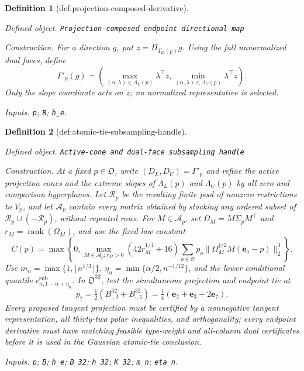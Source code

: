 \documentclass{article}
\newtheorem{definition}{Definition}
\begin{document}
\begin{definition}[def:projection-composed-derivative]\label{def:projection-composed-derivative}
\par\smallskip\noindent\emph{Defined object.} \texttt{Projection-\allowbreak{}composed endpoint directional map}
\par\smallskip\noindent\emph{Construction.} For a direction \(g\), put \(z=\Pi_{T_{\mathfrak O}(p)}g\).  Using the full unnormalized dual faces, define
\[
\Gamma'_p(g)=\left(
\max_{(\alpha,\lambda)\in\Lambda_L(p)}\lambda^{\top}z,
\min_{(\alpha,\lambda)\in\Lambda_U(p)}\lambda^{\top}z
\right).
\]
Only the slope coordinate acts on \(z\); no normalized representative is selected.
\par\smallskip\noindent\emph{Inputs.} \texttt{p}; \texttt{B}; \texttt{h\_\allowbreak{}e}.
\end{definition}

\begin{definition}[def:atomic-tie-subsampling-handle]\label{def:atomic-tie-subsampling-handle}
\par\smallskip\noindent\emph{Defined object.} \texttt{Active-\allowbreak{}cone and dual-\allowbreak{}face subsampling handle}
\par\smallskip\noindent\emph{Construction.} At a fixed \(p\in\mathfrak O\), write \((D_L,D_U)=\Gamma'_p\) and refine the active projection cones and the extreme slopes of \(\Lambda_L(p)\) and \(\Lambda_U(p)\) by all zero and comparison hyperplanes.  Let \(\mathcal R_p\) be the resulting finite pool of nonzero restrictions to \(V_p\), and let \(\mathcal A_p\) contain every matrix obtained by stacking any ordered subset of \(\mathcal R_p\cup(-\mathcal R_p)\), without repeated rows.  For \(M\in\mathcal A_p\), set \(\Omega_M=M\Sigma_pM^{\top}\) and \(r_M=\operatorname{rank}(\Omega_M)\), and use the fixed-law constant
\[
C(p)=\max\left\{0,\max_{M\in\mathcal A_p:r_M>0}(42r_M^{1/4}+16)
\sum_{o\in\mathcal O}p_o\|\Omega_M^{\dagger/2}M(\mathbf e_o-p)\|_2^3\right\}.
\]
Use \(m_n=\max\{1,\lfloor n^{1/3}\rfloor\}\), \(\eta_n=\min\{\alpha/2,n^{-1/12}\}\), and the lower conditional quantile \(c^{\mathrm{sub}}_{n,1-\alpha+\eta_n}\).  In \(\mathfrak O^{32}\), test the simultaneous projection and endpoint tie at
\[
p_\dagger=\tfrac12(B^{32}_{\cdot,3}+B^{32}_{\cdot,5})
=\tfrac14(\mathbf e_2+\mathbf e_3+2\mathbf e_7).
\]
Every proposed tangent projection must be certified by a nonnegative tangent representation, all thirty-two polar inequalities, and orthogonality; every endpoint derivative must have matching feasible type-weight and all-column dual certificates before it is used in the Gaussian atomic-tie conclusion.
\par\smallskip\noindent\emph{Inputs.} \texttt{p}; \texttt{B}; \texttt{h\_\allowbreak{}e}; \texttt{B\_\allowbreak{}32}; \texttt{h\_\allowbreak{}32}; \texttt{K\_\allowbreak{}32}; \texttt{m\_\allowbreak{}n}; \texttt{eta\_\allowbreak{}n}.
\end{definition}
\end{document}
